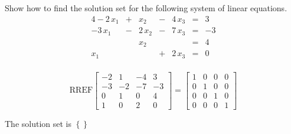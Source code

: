 
\begin{exerciseStatement}


Show how to find the solution set for the following system of linear equations. 
\begin{alignat*}{4} -2 \, x_{1} &+& x_{2} &-& 4 \, x_{3} &=& 3 \\-3 \, x_{1} &-& 2 \, x_{2} &-& 7 \, x_{3} &=& -3 \\ & & x_{2} & &  &=& 4 \\x_{1} & &  &+& 2 \, x_{3} &=& 0 \\ \end{alignat*}
            


\end{exerciseStatement}
    
\begin{exerciseAnswer} 
\[\mathrm{RREF} \left[\begin{array}{ccc|c}
-2 & 1 & -4 & 3 \\
-3 & -2 & -7 & -3 \\
0 & 1 & 0 & 4 \\
1 & 0 & 2 & 0
\end{array}\right]  =  \left[\begin{array}{ccc|c}
1 & 0 & 0 & 0 \\
0 & 1 & 0 & 0 \\
0 & 0 & 1 & 0 \\
0 & 0 & 0 & 1
\end{array}\right] \]

The solution set is \( \left\{\right\} \)


\end{exerciseAnswer}
    
